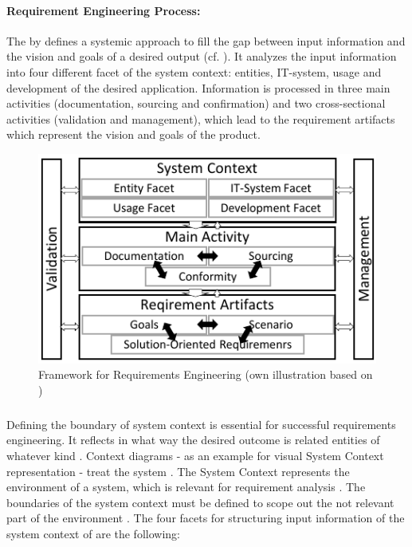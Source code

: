 \paragraph{Requirement Engineering Process:} The by \textcite{Pohl.2007} defines a systemic approach to fill the gap between input information and the vision and goals of a desired output (cf. ). It analyzes the input information into four different facet of the system context: entities, IT-system, usage and development of the desired application. Information is processed in three main activities (documentation, sourcing and confirmation) and two cross-sectional activities (validation and management), which lead to the requirement artifacts which represent the vision and goals of the product. \parencite[cf.][38-39]{Pohl.2007}
\begin{figure}[H]
    \centering
    \includegraphics[scale=1.5]{img/ReqAnFrameWork.pdf}
    \caption[Framework for Requirements Engineering]{Framework for Requirements Engineering (own illustration based on \cite[41]{Pohl.2007})}
    \label{fig:reqFramework}
\end{figure}
\subparagraph{} Defining the boundary of system context is essential for successful requirements engineering. It reflects in what way the desired outcome is related entities of whatever kind \parencite[55]{Pohl.2007}. Context diagrams \parencites[cf.][266]{Kossiakoff.2011} - as an example for visual System Context representation - treat the system  \parencite[76]{Lauesen.2008}. The System Context represents the environment of a system, which is relevant for requirement analysis \parencite[55]{Pohl.2007}. The boundaries of the system context must be defined to scope out the not relevant part of the environment \parencite[55-56]{Pohl.2007}. The four facets for structuring input information of the system context of \textcite{Pohl.2007} are the following:
